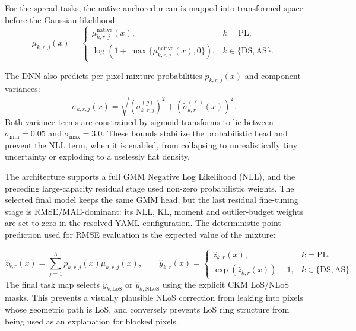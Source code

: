 For the spread tasks, the native anchored mean is mapped into transformed
space before the Gaussian likelihood:
\begin{equation}
\mu_{k,r,j}(x)
=
\begin{cases}
\mu^{\mathrm{native}}_{k,r,j}(x), & k=\mathrm{PL},\\
\log\!\left(1+\max\{\mu^{\mathrm{native}}_{k,r,j}(x),0\}\right),
& k\in\{\mathrm{DS},\mathrm{AS}\}.
\end{cases}
\label{eq:try80_mu_transform}
\end{equation}

The DNN also predicts per-pixel mixture probabilities \(p_{k,r,j}(x)\) and
component variances:
\begin{equation}
\sigma_{k,r,j}(x)
=
\sqrt{
\left(\sigma^{(g)}_{k,r,j}\right)^2
+
\left(\tilde\sigma^{(\ell)}_{k,r}(x)\right)^2
}.
\label{eq:try80_sigma}
\end{equation}
Both variance terms are constrained by sigmoid transforms to lie between
\(\sigma_{\min}=0.05\) and \(\sigma_{\max}=3.0\). These bounds stabilize the
probabilistic head and prevent the NLL term, when it is enabled, from
collapsing to unrealistically tiny uncertainty or exploding to a uselessly
flat density.

The architecture supports a full GMM Negative Log Likelihood (NLL), and the
preceding large-capacity residual stage used non-zero probabilistic weights.
The selected final model keeps the same GMM head, but the last residual
fine-tuning stage is RMSE/MAE-dominant: its NLL, KL, moment and
outlier-budget weights are set to zero in the resolved YAML configuration.
The deterministic point prediction used for RMSE evaluation is the expected
value of the mixture:

\begin{equation}
\hat z_{k,r}(x)
=
\sum_{j=1}^3 p_{k,r,j}(x)\mu_{k,r,j}(x),
\qquad
\hat y_{k,r}(x)
=
\begin{cases}
\hat z_{k,r}(x), & k=\mathrm{PL},\\
\exp(\hat z_{k,r}(x))-1, & k\in\{\mathrm{DS},\mathrm{AS}\}.
\end{cases}
\label{eq:try80_point}
\end{equation}
The final task map selects \(\hat y_{k,\mathrm{LoS}}\) or
\(\hat y_{k,\mathrm{NLoS}}\) using the explicit CKM LoS/NLoS masks. This
prevents a visually plausible NLoS correction from leaking into pixels whose
geometric path is LoS, and conversely prevents LoS ring structure from being
used as an explanation for blocked pixels.

